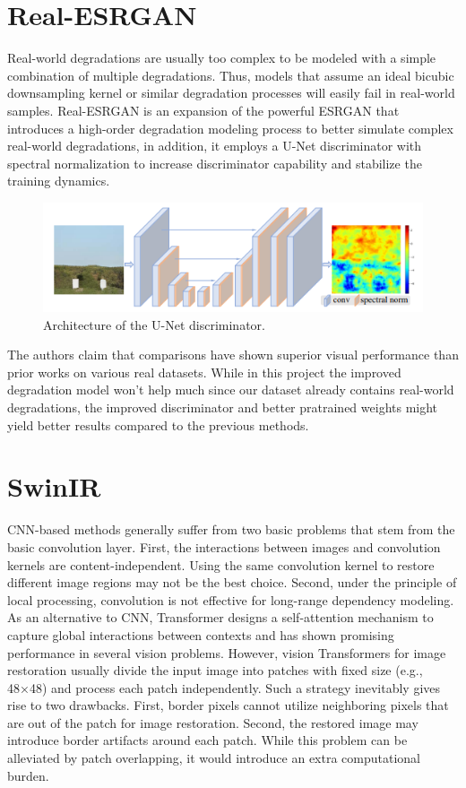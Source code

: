 \section{Real-ESRGAN}
\label{subsec:realesrgan}

Real-world degradations are usually too complex to be modeled with a simple combination of multiple degradations. Thus, models that assume an ideal bicubic
downsampling kernel or similar degradation processes will easily fail in real-world samples. Real-ESRGAN\cite{9711325} is an expansion of the powerful ESRGAN that introduces a high-order degradation modeling process to better simulate complex real-world degradations, in addition,
it employs a U-Net discriminator with spectral normalization to increase discriminator capability and stabilize the training dynamics.

\begin{figure}[H]
  \centering
  \includegraphics[scale=0.4]{figures/UNET.png}
  \caption{Architecture of the U-Net discriminator\cite{wang2021realesrgan}.}
  \label{img:UNET}
\end{figure}

The authors claim that comparisons have shown superior visual performance than prior works on various real datasets. While in this project the improved degradation model won't help much since our dataset already contains real-world degradations, the improved discriminator and better pratrained weights might yield better results compared to the previous methods.

\section{SwinIR}
\label{subsec:swinir}

CNN-based methods generally suffer from two basic
problems that stem from the basic convolution layer. First, the interactions between images and convolution kernels are content-independent. Using the same convolution kernel to restore different image regions may not be the best choice. Second, under the principle of local processing, convolution is not effective for long-range dependency modeling. As an alternative to CNN, Transformer designs a self-attention mechanism to capture global interactions between contexts and has shown promising performance in several vision problems. However, vision Transformers for image restoration usually divide the input image into patches with fixed size (e.g., 48×48) and process each patch independently. Such a strategy inevitably gives rise to two drawbacks. First, border pixels cannot utilize neighboring pixels that are out of the patch for image restoration. Second, the restored image may introduce border artifacts around each patch. While this problem can be alleviated by patch overlapping, it would introduce an extra computational burden.

